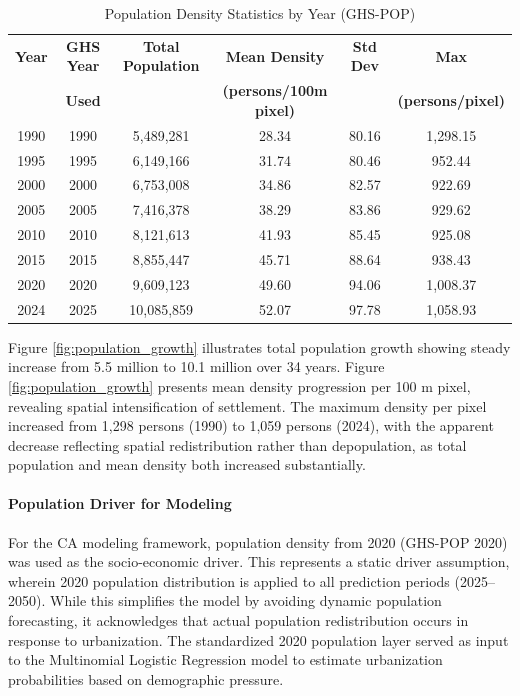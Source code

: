 \documentclass[12pt,a4paper]{article}
\begin{document}
\begin{table}[H]
\caption{Population Density Statistics by Year (GHS-POP)}
\label{tab:population_stats}
\centering
\small
\renewcommand{\arraystretch}{1.2}
\begin{tabular}{cccccc}
\toprule
\textbf{Year} & \textbf{GHS Year} & \textbf{Total Population} & \textbf{Mean Density} & \textbf{Std Dev} & \textbf{Max} \\
 & \textbf{Used} & & \textbf{(persons/100m pixel)} & & \textbf{(persons/pixel)} \\
\midrule
1990 & 1990 & 5,489,281 & 28.34 & 80.16 & 1,298.15 \\
1995 & 1995 & 6,149,166 & 31.74 & 80.46 & 952.44 \\
2000 & 2000 & 6,753,008 & 34.86 & 82.57 & 922.69 \\
2005 & 2005 & 7,416,378 & 38.29 & 83.86 & 929.62 \\
2010 & 2010 & 8,121,613 & 41.93 & 85.45 & 925.08 \\
2015 & 2015 & 8,855,447 & 45.71 & 88.64 & 938.43 \\
2020 & 2020 & 9,609,123 & 49.60 & 94.06 & 1,008.37 \\
2024 & 2025 & 10,085,859 & 52.07 & 97.78 & 1,058.93 \\
\bottomrule
\end{tabular}
\end{table}

Figure \ref{fig:population_growth} illustrates total population growth showing steady increase from 5.5 million to 10.1 million over 34 years. Figure \ref{fig:population_growth} presents mean density progression per 100 m pixel, revealing spatial intensification of settlement. The maximum density per pixel increased from 1,298 persons (1990) to 1,059 persons (2024), with the apparent decrease reflecting spatial redistribution rather than depopulation, as total population and mean density both increased substantially.


\paragraph{Population Driver for Modeling}
For the CA modeling framework, population density from 2020 (GHS-POP 2020) was used as the socio-economic driver. This represents a static driver assumption, wherein 2020 population distribution is applied to all prediction periods (2025--2050). While this simplifies the model by avoiding dynamic population forecasting, it acknowledges that actual population redistribution occurs in response to urbanization. The standardized 2020 population layer served as input to the Multinomial Logistic Regression model to estimate urbanization probabilities based on demographic pressure.
\end{document}
